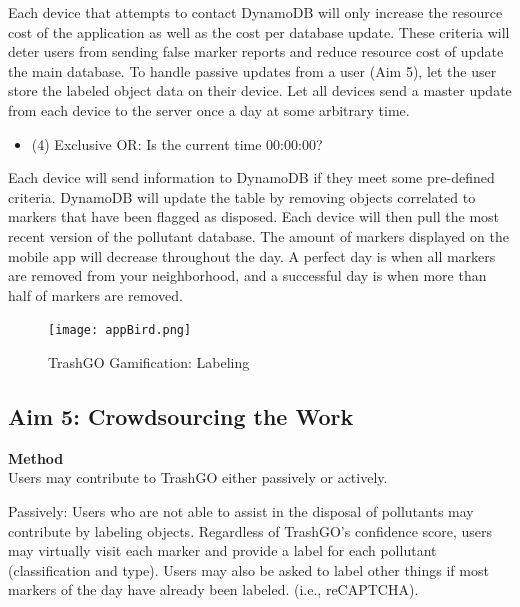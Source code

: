 \documentclass[
  journal=small,
  manuscript=article-type,  %
  year=2022,
  volume=1,
]{cup-journal}
\begin{document}
Each device that attempts to contact DynamoDB will only increase the resource cost of the application as well as the cost per database update. These criteria will deter users from sending false marker reports and reduce resource cost of update the main database. To handle passive updates from a user (Aim 5), let the user store the labeled object data on their device. Let all devices send a master update from each device to the server once a day at some arbitrary time.

\begin{itemize}
    \item (4) Exclusive OR: Is the current time 00:00:00?
\end{itemize}

Each device will send information to DynamoDB if they meet some pre-defined criteria. DynamoDB will update the table by removing objects correlated to markers that have been flagged as disposed. Each device will then pull the most recent version of the pollutant database. The amount of markers displayed on the mobile app will decrease throughout the day. A perfect day is when all markers are removed from your neighborhood, and a successful day is when more than half of markers are removed. 

\begin{figure}[h!]
    \centering
    \texttt{[image: appBird.png]}
    \caption{TrashGO Gamification: Labeling}
    \label{trash_game}
\end{figure}
\vspace*{-1.5em}
\subsection{Aim 5: Crowdsourcing the Work}
\textbf{Method}\\
Users may contribute to TrashGO either passively or actively. 

Passively: Users who are not able to assist in the disposal of pollutants may contribute by labeling objects. Regardless of TrashGO's confidence score, users may virtually visit each marker and provide a label for each pollutant (classification and type). Users may also be asked to label other things if most markers of the day have already been labeled. (i.e., reCAPTCHA).
\end{document}

